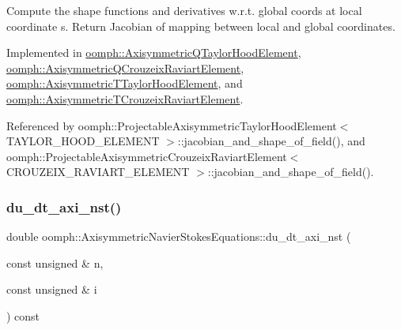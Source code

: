 Compute the shape functions and derivatives w.\+r.\+t. global coords at local coordinate s. Return Jacobian of mapping between local and global coordinates. 



Implemented in \hyperlink{classoomph_1_1AxisymmetricQTaylorHoodElement_a413aba20f944dc30c84bb432c408cbc1}{oomph\+::\+Axisymmetric\+Q\+Taylor\+Hood\+Element}, \hyperlink{classoomph_1_1AxisymmetricQCrouzeixRaviartElement_a48bd4be228495e97e5d8bf8a70162182}{oomph\+::\+Axisymmetric\+Q\+Crouzeix\+Raviart\+Element}, \hyperlink{classoomph_1_1AxisymmetricTTaylorHoodElement_ae5d9f04db6805c64a9c1f6d5ba68c3a4}{oomph\+::\+Axisymmetric\+T\+Taylor\+Hood\+Element}, and \hyperlink{classoomph_1_1AxisymmetricTCrouzeixRaviartElement_a0ee2d8653afb290ec3215e976f34830d}{oomph\+::\+Axisymmetric\+T\+Crouzeix\+Raviart\+Element}.



Referenced by oomph\+::\+Projectable\+Axisymmetric\+Taylor\+Hood\+Element$<$ T\+A\+Y\+L\+O\+R\+\_\+\+H\+O\+O\+D\+\_\+\+E\+L\+E\+M\+E\+N\+T $>$\+::jacobian\+\_\+and\+\_\+shape\+\_\+of\+\_\+field(), and oomph\+::\+Projectable\+Axisymmetric\+Crouzeix\+Raviart\+Element$<$ C\+R\+O\+U\+Z\+E\+I\+X\+\_\+\+R\+A\+V\+I\+A\+R\+T\+\_\+\+E\+L\+E\+M\+E\+N\+T $>$\+::jacobian\+\_\+and\+\_\+shape\+\_\+of\+\_\+field().

\mbox{\label{classoomph_1_1AxisymmetricNavierStokesEquations_a80b3415e150243f8fff3f8eb87082b24}} 
\subsubsection{\texorpdfstring{du\+\_\+dt\+\_\+axi\+\_\+nst()}{du\_dt\_axi\_nst()}}
{\footnotesize\ttfamily double oomph\+::\+Axisymmetric\+Navier\+Stokes\+Equations\+::du\+\_\+dt\+\_\+axi\+\_\+nst (\begin{DoxyParamCaption}\item[{const unsigned \&}]{n,  }\item[{const unsigned \&}]{i }\end{DoxyParamCaption}) const\hspace{0.3cm}{\ttfamily [inline]}}



